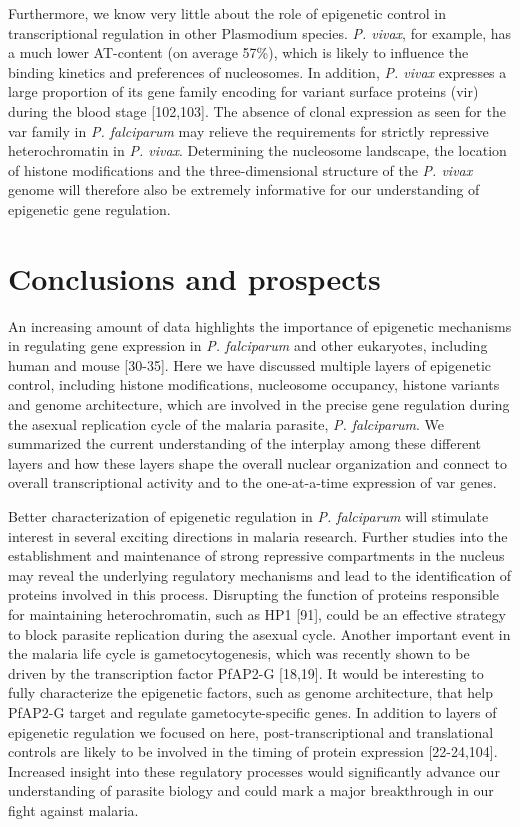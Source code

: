 Furthermore, we know very little about the role of epigenetic control in
transcriptional regulation in other Plasmodium species. \textit{P. vivax}, for example,
has a much lower AT-content (on average 57\%), which is likely to influence the
binding kinetics and preferences of nucleosomes. In addition, \textit{P.
vivax}
expresses a large proportion of its gene family encoding for variant surface
proteins (vir) during the blood stage [102,103]. The absence of clonal
expression as seen for the var family in \textit{P. falciparum} may relieve the
requirements for strictly repressive heterochromatin in \textit{P. vivax}. Determining
the nucleosome landscape, the location of histone modifications and the
three-dimensional structure of the \textit{P. vivax} genome will therefore also be
extremely informative for our understanding of epigenetic gene regulation.


\section{Conclusions and prospects}
An increasing amount of data highlights the importance of epigenetic
mechanisms in regulating gene expression in \textit{P. falciparum} and other
eukaryotes, including human and mouse [30-35]. Here we have discussed multiple
layers of epigenetic control, including histone modifications, nucleosome
occupancy, histone variants and genome architecture, which are involved in the
precise gene regulation during the asexual replication cycle of the malaria
parasite, \textit{P. falciparum}. We summarized the current understanding of the
interplay among these different layers and how these layers shape the overall
nuclear organization and connect to overall transcriptional activity and to
the one-at-a-time expression of var genes.

Better characterization of epigenetic regulation in \textit{P. falciparum} will
stimulate interest in several exciting directions in malaria research. Further
studies into the establishment and maintenance of strong repressive
compartments in the nucleus may reveal the underlying regulatory mechanisms
and lead to the identification of proteins involved in this process.
Disrupting the function of proteins responsible for maintaining
heterochromatin, such as HP1 [91], could be an effective strategy to block
parasite replication during the asexual cycle. Another important event in the
malaria life cycle is gametocytogenesis, which was recently shown to be driven
by the transcription factor PfAP2-G [18,19]. It would be interesting to fully
characterize the epigenetic factors, such as genome architecture, that help
PfAP2-G target and regulate gametocyte-specific genes. In addition to layers
of epigenetic regulation we focused on here, post-transcriptional and
translational controls are likely to be involved in the timing of protein
expression [22-24,104].  Increased insight into these regulatory processes
would significantly advance our understanding of parasite biology and could
mark a major breakthrough in our fight against malaria.


